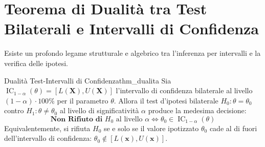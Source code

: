 \section{Teorema di Dualità tra Test Bilaterali e Intervalli di Confidenza}
\label{sec:dualita_test_ic}

Esiste un profondo legame strutturale e algebrico tra l'inferenza per intervalli e la verifica delle ipotesi.

\begin{teorema}{Dualità Test-Intervalli di Confidenza}{thm_dualita}
Sia $\operatorname{IC}_{1-\alpha}(\theta) = [L(\mathbf{X}), U(\mathbf{X})]$ l'intervallo di confidenza bilaterale al livello $(1-\alpha) \cdot 100\%$ per il parametro $\theta$.
Allora il test d'ipotesi bilaterale $H_0: \theta = \theta_0$ contro $H_1: \theta \neq \theta_0$ al livello di significatività $\alpha$ produce la medesima decisione:
\begin{equation}
    \textbf{Non Rifiuto di } H_0 \text{ al livello } \alpha \iff \theta_0 \in \operatorname{IC}_{1-\alpha}(\theta)
\end{equation}
Equivalentemente, si rifiuta $H_0$ se e solo se il valore ipotizzato $\theta_0$ cade al di fuori dell'intervallo di confidenza: $\theta_0 \notin [L(\mathbf{x}), U(\mathbf{x})]$.
\end{teorema}
